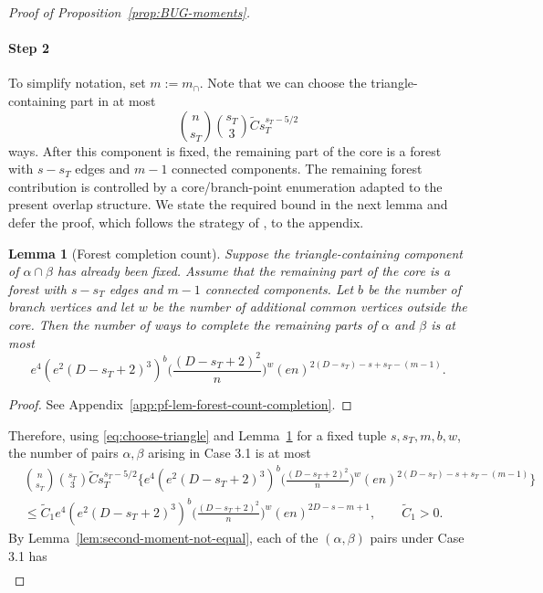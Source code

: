\documentclass[11pt, letterpaper]{article}
\newtheorem{lemma}[theorem]{Lemma}
\numberwithin{equation}{section}
\begin{document}
\begin{proof}[Proof of Proposition~\ref{prop:BUG-moments}]
\paragraph*{Step 2}
To simplify notation, set $m:=m_\cap$. Note that we can choose the triangle-containing part in at most 
\begin{equation}\label{eq:choose-triangle}
    \binom{n}{s_T}\binom{s_T}{3}\tilde C s_T^{s_T-5/2}
\end{equation}
ways. After this component is fixed, the remaining part of the core is a forest with $s-s_T$ edges and $m-1$ connected components. The remaining forest contribution is controlled by a core/branch-point enumeration adapted to the present overlap structure. We state the required bound in the next lemma and defer the proof, which follows the strategy of \cite[Proof of Theorem 2.2(b), Case 3]{sohn2025sharp}, to the appendix.
\begin{lemma}[Forest completion count]\label{lem:forest-completion-count} Suppose the triangle-containing component of $\alpha\cap\beta$ has already been fixed. Assume that the remaining part of the core is a forest with $s-s_T$ edges and $m-1$ connected components.  Let $b$ be the number of branch vertices and let $w$ be the number of additional common vertices outside the core. Then the number of ways to complete the remaining parts of $\alpha$ and $\beta$ is at most
    \begin{equation*}
        e^{4}(e^2(D-s_T+2)^3)^b\bigg(\frac{(D-s_T+2)^2}{n}\bigg)^w\left(en\right)^{2(D-s_T)-s+s_T-(m-1)}.
    \end{equation*}
\end{lemma}
\begin{proof}
See Appendix~\ref{app:pf-lem-forest-count-completion}.
\end{proof}
Therefore, using \eqref{eq:choose-triangle} and Lemma~\ref{lem:forest-completion-count} for a fixed tuple $s,s_T,m,b,w$, the number of pairs $\alpha,\beta$ arising in Case 3.1 is at most
\begin{align*}
    &\binom{n}{s_T}\binom{s_T}{3} \tilde Cs_T^{s_T-5/2}\biggl\{e^4(e^2(D-s_T+2)^3)^b\bigg(\frac{(D-s_T+2)^2}{n}\bigg)^w\left(en\right)^{2(D-s_T)-s+s_T-(m-1)}\biggr\}\\
    &\le \tilde C_1e^4(e^2(D-s_T+2)^3)^b\bigg(\frac{(D-s_T+2)^2}{n}\bigg)^w\left(en\right)^{2D-s-m+1}, \qquad \tilde C_1>0.
\end{align*}
By Lemma~\ref{lem:second-moment-not-equal}, each of the $(\alpha,\beta)$ pairs under Case 3.1 has 
\begin{align*}

\end{align*}
\end{proof}
\end{document}
